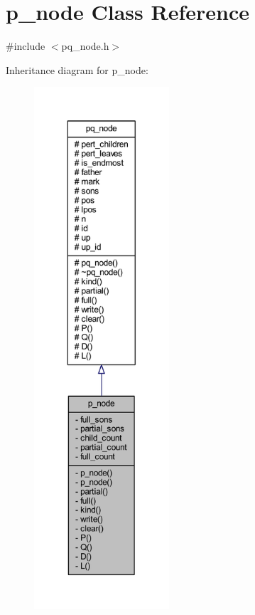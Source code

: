 \hypertarget{classp__node}{}\section{p\+\_\+node Class Reference}
\label{classp__node}


{\ttfamily \#include $<$pq\+\_\+node.\+h$>$}



Inheritance diagram for p\+\_\+node\+:\nopagebreak
\begin{figure}[H]
\begin{center}
\leavevmode
\includegraphics[height=550pt]{classp__node__inherit__graph}
\end{center}
\end{figure}


